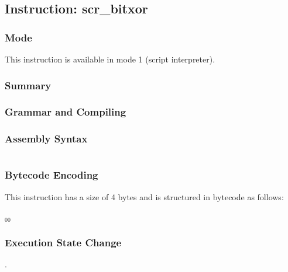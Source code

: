 \subsection{Instruction: scr\_bitxor}

\subsubsection{Mode}
This instruction is available in mode 1 (script interpreter).
\subsubsection{Summary}


\subsubsection{Grammar and Compiling}


\subsubsection{Assembly Syntax}

\begin{myquote}
\begin{verbatim}

\end{verbatim}
\end{myquote}

\subsubsection{Bytecode Encoding}

This instruction has a size of 4 bytes and is structured in bytecode as follows:

$_{00}$\ 


\subsubsection{Execution State Change}

.


